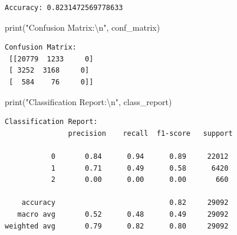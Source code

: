 \documentclass[
  letterpaper,
  DIV=11,
  numbers=noendperiod]{scrartcl}
\newenvironment{Shaded}{\begin{snugshade}}{\end{snugshade}}
\newcommand{\BuiltInTok}[1]{\textcolor[rgb]{0.00,0.23,0.31}{#1}}
\newcommand{\CharTok}[1]{\textcolor[rgb]{0.13,0.47,0.30}{#1}}
\newcommand{\NormalTok}[1]{\textcolor[rgb]{0.00,0.23,0.31}{#1}}
\newcommand{\StringTok}[1]{\textcolor[rgb]{0.13,0.47,0.30}{#1}}
\begin{document}
\begin{verbatim}
Accuracy: 0.8231472569778633
\end{verbatim}

\begin{Shaded}
\begin{Highlighting}[]
\BuiltInTok{print}\NormalTok{(}\StringTok{"Confusion Matrix:}\CharTok{\textbackslash{}n}\StringTok{"}\NormalTok{, conf\_matrix)}
\end{Highlighting}
\end{Shaded}

\begin{verbatim}
Confusion Matrix:
 [[20779  1233     0]
 [ 3252  3168     0]
 [  584    76     0]]
\end{verbatim}

\begin{Shaded}
\begin{Highlighting}[]
\BuiltInTok{print}\NormalTok{(}\StringTok{"Classification Report:}\CharTok{\textbackslash{}n}\StringTok{"}\NormalTok{, class\_report)}
\end{Highlighting}
\end{Shaded}

\begin{verbatim}
Classification Report:
               precision    recall  f1-score   support

           0       0.84      0.94      0.89     22012
           1       0.71      0.49      0.58      6420
           2       0.00      0.00      0.00       660

    accuracy                           0.82     29092
   macro avg       0.52      0.48      0.49     29092
weighted avg       0.79      0.82      0.80     29092
\end{verbatim}
\end{document}
